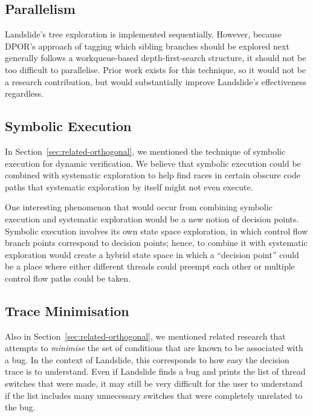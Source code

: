 \subsection{Parallelism}

Landslide's tree exploration is implemented sequentially. However, because DPOR's approach of tagging which sibling branches should be explored next generally follows a workqueue-based depth-first-search structure, it should not be too difficult to parallelise. Prior work exists for this technique\cite{distributed-dpor}, so it would not be a research contribution, but would substantially improve Landslide's effectiveness regardless.

\subsection{Symbolic Execution}
\label{sec:future-dawson}

In Section~\ref{sec:related-orthogonal}, we mentioned the technique of symbolic execution for dynamic verification. We believe that symbolic execution could be combined with systematic exploration to help find races in certain obscure code paths that systematic exploration by itself might not even execute.

One interesting phenomenon that would occur from combining symbolic execution and systematic exploration would be a new notion of decision points. Symbolic execution involves its own state space exploration, in which control flow branch points correspond to decision points; hence, to combine it with systematic exploration would create a hybrid state space in which a ``decision point'' could be a place where either different threads could preempt each other or multiple control flow paths could be taken\cite{dawson}.

\subsection{Trace Minimisation}
\label{sec:future-trace-minimisation}

Also in Section~\ref{sec:related-orthogonal}, we mentioned related research that attempts to {\em minimise} the set of conditions that are known to be associated with a bug\cite{dag-mining}.
In the context of Landslide, this corresponds to how easy the decision trace is to understand. Even if Landslide finds a bug and prints the list of thread switches that were made, it may still be very difficult for the user to understand if the list includes many unnecessary switches that were completely unrelated to the bug.

